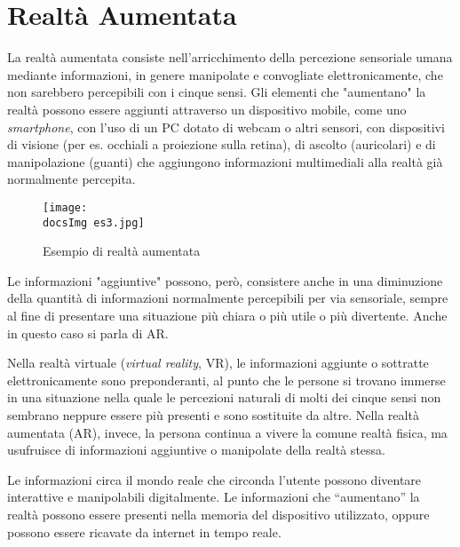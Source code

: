 \section{Realt\`a Aumentata}
La realtà aumentata consiste nell'arricchimento della percezione sensoriale umana mediante informazioni, in genere manipolate e convogliate elettronicamente, che non sarebbero percepibili con i cinque sensi.
Gli elementi che "aumentano" la realtà possono essere aggiunti attraverso un dispositivo mobile, come uno \textit{smartphone}, con l'uso di un PC dotato di webcam o altri sensori, con dispositivi di visione (per es. occhiali a proiezione sulla retina), di ascolto (auricolari) e di manipolazione (guanti) che aggiungono informazioni multimediali alla realtà già normalmente percepita.

\begin{figure}[H]
	\centering
	\texttt{[image: \\docsImg es3.jpg]}
	\caption{Esempio di realt\`a aumentata}
	\label{fig:Esempio di realta' aumentata presente nell'app Experenti - Motore}
\end{figure}

Le informazioni "aggiuntive" possono, per\`o, consistere anche in una diminuzione della quantità di informazioni normalmente percepibili per via sensoriale, sempre al fine di presentare una situazione più chiara o più utile o più divertente. Anche in questo caso si parla di AR.

Nella realtà virtuale (\textit{virtual reality}, VR), le informazioni aggiunte o sottratte elettronicamente sono preponderanti, al punto che le persone si trovano immerse in una situazione nella quale le percezioni naturali di molti dei cinque sensi non sembrano neppure essere più presenti e sono sostituite da altre. Nella realtà aumentata (AR), invece, la persona continua a vivere la comune realtà fisica, ma usufruisce di informazioni aggiuntive o manipolate della realtà stessa.

Le informazioni circa il mondo reale che circonda l'utente possono diventare interattive e manipolabili digitalmente.
Le informazioni che “aumentano” la realtà possono essere presenti nella memoria del dispositivo utilizzato, oppure possono essere ricavate da internet in tempo reale.

